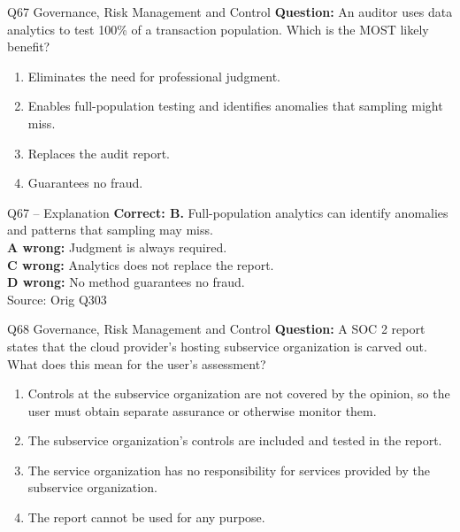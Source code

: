 \documentclass[aspectratio=169,10pt]{beamer}
\begin{document}
\begin{frame}[t]{Q67 \hfill {\scriptsize Governance, Risk Management and Control}}
	\small
	\textbf{Question:} An auditor uses data analytics to test 100\% of a transaction population. Which is the MOST likely benefit?
	\begin{enumerate}[label=\Alph*.,itemsep=1pt,topsep=3pt]
			\item Eliminates the need for professional judgment.
			\item Enables full-population testing and identifies anomalies that sampling might miss.
			\item Replaces the audit report.
			\item Guarantees no fraud.
	\end{enumerate}
\end{frame}

\begin{frame}[t]{Q67 -- Explanation}
	\footnotesize
	\textbf{Correct: B.} Full-population analytics can identify anomalies and patterns that sampling may miss. \\[5pt]
\textbf{A wrong:} Judgment is always required. \\[3pt]
\textbf{C wrong:} Analytics does not replace the report. \\[3pt]
\textbf{D wrong:} No method guarantees no fraud. \\[3pt]
	\vfill {\tiny Source: Orig Q303}
\end{frame}

\begin{frame}[t]{Q68 \hfill {\scriptsize Governance, Risk Management and Control}}
	\small
	\textbf{Question:} A SOC 2 report states that the cloud provider's hosting subservice organization is carved out. What does this mean for the user's assessment?
	\begin{enumerate}[label=\Alph*.,itemsep=1pt,topsep=3pt]
			\item Controls at the subservice organization are not covered by the opinion, so the user must obtain separate assurance or otherwise monitor them.
			\item The subservice organization's controls are included and tested in the report.
			\item The service organization has no responsibility for services provided by the subservice organization.
			\item The report cannot be used for any purpose.
	\end{enumerate}
\end{frame}
\end{document}
